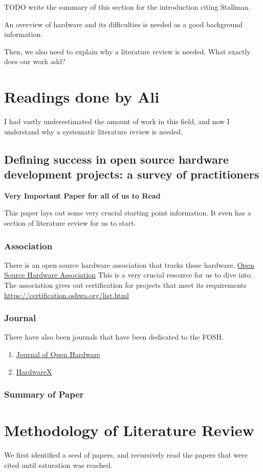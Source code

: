 \documentclass{article}
\begin{document}
TODO write the summary of this section for the introduction citing Stallman.

An overview of hardware and its difficulties is needed as a good background information. 

Then, we also need to explain why a literature review is needed.
What exactly does our work add?

\section{Readings done by Ali}

I had vastly underestimated the amount of work in this field, and now I understand why a systematic literature review is needed.

\subsection{Defining success in open source hardware development projects: a survey of practitioners}
\cite{p1_def_succ}

\textbf{Very Important Paper for all of us to Read}

This paper lays out some very crucial starting point information.
It even has a section of literature review for us to start.

\subsubsection{Association}
There is an open source hardware association that tracks these hardware.
\href{https://www.oshwa.org}{Open Source Hardware Association}
This is a very crucial resource for us to dive into. 
The association gives out certification for projects that meet its requirements
\href{https://certification.oshwa.org/list.html}{https://certification.oshwa.org/list.html}

\subsubsection{Journal}
There have also been journals that have been dedicated to the FOSH.
\begin{enumerate}
    \item \href{https://openhardware.metajnl.com/}{Journal of Open Hardware}
    \item \href{https://www.sciencedirect.com/journal/hardwarex}{HardwareX}
\end{enumerate}

\subsubsection{Summary of Paper}

\section{Methodology of Literature Review}
We first identified a seed of papers, and recursively read the papers that were cited until saturation was reached. 

\nocite{*}
\printbibliography
\end{document}

